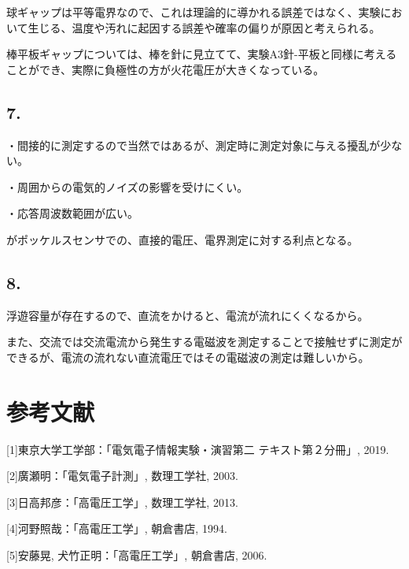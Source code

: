 \documentclass[dvipdfmx, twocolumn]{jsarticle}
\begin{document}
球ギャップは平等電界なので、これは理論的に導かれる誤差ではなく、実験において生じる、温度や汚れに起因する誤差や確率の偏りが原因と考えられる。


棒平板ギャップについては、棒を針に見立てて、実験A3針-平板と同様に考えることができ、実際に負極性の方が火花電圧が大きくなっている。
\subsection*{7.}
・間接的に測定するので当然ではあるが、測定時に測定対象に与える擾乱が少ない。

・周囲からの電気的ノイズの影響を受けにくい。

・応答周波数範囲が広い。

がポッケルスセンサでの、直接的電圧、電界測定に対する利点となる。
\subsection*{8.}
浮遊容量が存在するので、直流をかけると、電流が流れにくくなるから。

また、交流では交流電流から発生する電磁波を測定することで接触せずに測定ができるが、電流の流れない直流電圧ではその電磁波の測定は難しいから。




\section{参考文献}
[1]東京大学工学部：「電気電子情報実験・演習第二 テキスト第２分冊」, 2019.

[2]廣瀬明：「電気電子計測」, 数理工学社, 2003.

[3]日高邦彦：「高電圧工学」, 数理工学社, 2013.

[4]河野照哉：「高電圧工学」, 朝倉書店, 1994.

[5]安藤晃, 犬竹正明：「高電圧工学」, 朝倉書店, 2006.
\end{document}
